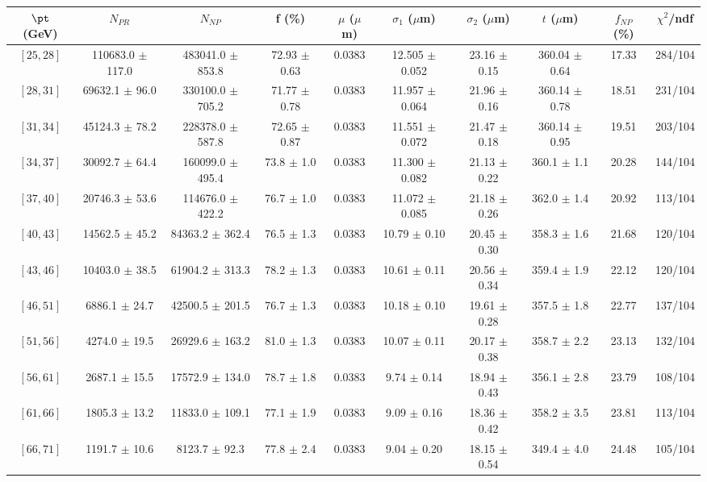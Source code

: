 \begin{tabular}{c||c|c|c|c|c|c|c||c|c}
$\pt$ (GeV) & $N_{PR}$ & $N_{NP}$ & f (\%) & $\mu$ ($\mu$m) & $\sigma_1$ ($\mu$m) & $\sigma_2$ ($\mu$m)  & $t$ ($\mu$m) & $f_{NP}$ (\%) & $\chi^2$/ndf \\
\hline
$[25, 28]$ & 110683.0 $\pm$ 117.0 & 483041.0 $\pm$ 853.8 & 72.93 $\pm$ 0.63 & 0.0383 & 12.505 $\pm$ 0.052 & 23.16 $\pm$ 0.15 & 360.04 $\pm$ 0.64 & 17.33 & 284/104\\
$[28, 31]$ & 69632.1 $\pm$ 96.0 & 330100.0 $\pm$ 705.2 & 71.77 $\pm$ 0.78 & 0.0383 & 11.957 $\pm$ 0.064 & 21.96 $\pm$ 0.16 & 360.14 $\pm$ 0.78 & 18.51 & 231/104\\
$[31, 34]$ & 45124.3 $\pm$ 78.2 & 228378.0 $\pm$ 587.8 & 72.65 $\pm$ 0.87 & 0.0383 & 11.551 $\pm$ 0.072 & 21.47 $\pm$ 0.18 & 360.14 $\pm$ 0.95 & 19.51 & 203/104\\
$[34, 37]$ & 30092.7 $\pm$ 64.4 & 160099.0 $\pm$ 495.4 & 73.8 $\pm$ 1.0 & 0.0383 & 11.300 $\pm$ 0.082 & 21.13 $\pm$ 0.22 & 360.1 $\pm$ 1.1 & 20.28 & 144/104\\
$[37, 40]$ & 20746.3 $\pm$ 53.6 & 114676.0 $\pm$ 422.2 & 76.7 $\pm$ 1.0 & 0.0383 & 11.072 $\pm$ 0.085 & 21.18 $\pm$ 0.26 & 362.0 $\pm$ 1.4 & 20.92 & 113/104\\
$[40, 43]$ & 14562.5 $\pm$ 45.2 & 84363.2 $\pm$ 362.4 & 76.5 $\pm$ 1.3 & 0.0383 & 10.79 $\pm$ 0.10 & 20.45 $\pm$ 0.30 & 358.3 $\pm$ 1.6 & 21.68 & 120/104\\
$[43, 46]$ & 10403.0 $\pm$ 38.5 & 61904.2 $\pm$ 313.3 & 78.2 $\pm$ 1.3 & 0.0383 & 10.61 $\pm$ 0.11 & 20.56 $\pm$ 0.34 & 359.4 $\pm$ 1.9 & 22.12 & 120/104\\
$[46, 51]$ & 6886.1 $\pm$ 24.7 & 42500.5 $\pm$ 201.5 & 76.7 $\pm$ 1.3 & 0.0383 & 10.18 $\pm$ 0.10 & 19.61 $\pm$ 0.28 & 357.5 $\pm$ 1.8 & 22.77 & 137/104\\
$[51, 56]$ & 4274.0 $\pm$ 19.5 & 26929.6 $\pm$ 163.2 & 81.0 $\pm$ 1.3 & 0.0383 & 10.07 $\pm$ 0.11 & 20.17 $\pm$ 0.38 & 358.7 $\pm$ 2.2 & 23.13 & 132/104\\
$[56, 61]$ & 2687.1 $\pm$ 15.5 & 17572.9 $\pm$ 134.0 & 78.7 $\pm$ 1.8 & 0.0383 & 9.74 $\pm$ 0.14 & 18.94 $\pm$ 0.43 & 356.1 $\pm$ 2.8 & 23.79 & 108/104\\
$[61, 66]$ & 1805.3 $\pm$ 13.2 & 11833.0 $\pm$ 109.1 & 77.1 $\pm$ 1.9 & 0.0383 & 9.09 $\pm$ 0.16 & 18.36 $\pm$ 0.42 & 358.2 $\pm$ 3.5 & 23.81 & 113/104\\
$[66, 71]$ & 1191.7 $\pm$ 10.6 & 8123.7 $\pm$ 92.3 & 77.8 $\pm$ 2.4 & 0.0383 & 9.04 $\pm$ 0.20 & 18.15 $\pm$ 0.54 & 349.4 $\pm$ 4.0 & 24.48 & 105/104\\

\end{tabular}
